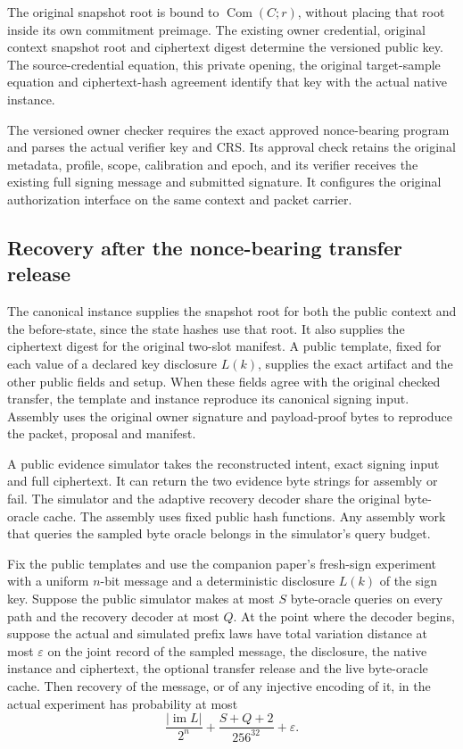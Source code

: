The original snapshot root is bound to \(\operatorname{Com}(C;r)\), without
placing that root inside its own commitment preimage. The existing owner
credential, original context snapshot root and ciphertext digest determine
the versioned public key. The source-credential equation, this private
opening, the original target-sample equation and ciphertext-hash agreement
identify that key with the actual native instance.

The versioned owner checker requires the exact approved nonce-bearing
program and parses the actual verifier key and CRS. Its approval check
retains the original metadata, profile, scope, calibration and epoch, and its
verifier receives the existing full signing message and submitted signature.
It configures the original authorization interface on the same context and
packet carrier.

\subsection{Recovery after the nonce-bearing transfer release}

The canonical instance supplies the snapshot root for both the public
context and the before-state, since the state hashes use that root. It also
supplies the ciphertext digest for the original two-slot manifest. A public
template, fixed for each value of a declared key disclosure \(L(k)\), supplies
the exact artifact and the other public fields and setup. When these fields
agree with the original checked transfer, the template and instance reproduce
its canonical signing input. Assembly uses the original owner signature and
payload-proof bytes to reproduce the packet, proposal and manifest.

A public evidence simulator takes the reconstructed intent, exact signing
input and full ciphertext. It can return the two evidence byte strings for
assembly or fail. The simulator and the adaptive recovery decoder share the
original byte-oracle cache. The assembly uses fixed public hash functions.
Any assembly work that queries the sampled byte oracle belongs in the
simulator's query budget.

\begin{proposition}
\label{prop:joint-release-recovery}
Fix the public templates and use the companion paper's fresh-sign experiment
with a uniform \(n\)-bit message and a deterministic disclosure \(L(k)\) of
the sign key. Suppose the public simulator makes at most \(S\) byte-oracle
queries on every path and the recovery decoder at most \(Q\). At the point
where the decoder begins, suppose the
actual and simulated prefix laws have total variation distance at most
\(\varepsilon\) on the joint record of the sampled message, the disclosure,
the native instance and ciphertext, the optional transfer release and the
live byte-oracle cache. Then recovery of the message, or of any injective
encoding of it, in the actual experiment has probability at most
\[
  \frac{|\operatorname{im}L|}{2^n}+
  \frac{S+Q+2}{256^{32}}+\varepsilon .
\]
\end{proposition}

